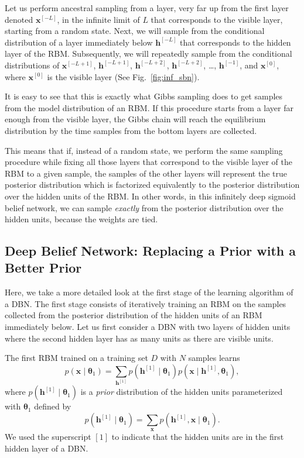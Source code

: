 \documentclass[dissertation,nocontribution,draft*]{aaltoseries}
\newcommand{\qlay}[1]{\left[#1\right]}
\newcommand{\vect}[1]{\mathbf{#1}}
\newcommand{\vects}[1]{\boldsymbol{#1}}
\newcommand{\vh}[0]{\vect{h}}
\newcommand{\vx}[0]{\vect{x}}
\newcommand{\TT}[0]{{\vects{\theta}}}
\begin{document}
Let us perform ancestral sampling from a layer, very far up
from the first layer denoted $\vx^{\qlay{-L}}$, in the infinite
limit of $L$ that corresponds
to the visible layer, starting from a random state.  Next,
we will sample from the conditional distribution of a layer
immediately below $\vh^{\qlay{-L}}$ that corresponds to the
hidden layer of the RBM. Subsequently, we will repeatedly
sample from the conditional distributions of $\vx^{\qlay{-L+1}}$,
$\vh^{\qlay{-L+1}}$, $\vh^{\qlay{-L+2}}$, $\vh^{\qlay{-L+2}}$, \dots,
$\vh^{\qlay{-1}}$, and $\vx^{\qlay{0}}$, where $\vx^{\qlay{0}}$ is the
visible layer (See Fig.~\ref{fig:inf_sbn}). 

It is easy to see that this is exactly what Gibbs sampling
does to get samples from the model distribution of an RBM.
If this procedure starts from a layer far enough from the
visible layer, the Gibbs chain will reach the equilibrium
distribution by the time samples from the bottom layers are
collected. 

This means that if, instead of a random state, we perform
the same sampling procedure while fixing all those layers
that correspond to the visible layer of the RBM to a given
sample, the samples of the other layers will represent the
true posterior distribution which is factorized equivalently
to the posterior distribution over the hidden units of the
RBM. In other words, in this infinitely deep sigmoid belief
network, we can sample \textit{exactly} from the posterior
distribution over the hidden units, because the weights are
tied.

\subsection{Deep Belief Network: Replacing a Prior with a
Better Prior}
\label{sec:dbn_rbm}

Here, we take a more detailed look at the first stage of the
learning algorithm of a DBN.
The first stage consists of
iteratively training an RBM on the samples collected from
the posterior distribution of the hidden units of an RBM
immediately below. Let us first consider a DBN with two
layers of hidden units where the second hidden layer has
as many units as there are visible units.

The first RBM trained on a training set $D$ with $N$ samples
learns
\[
p(\vx \mid \TT_1) = \sum_{\vh^{\qlay{1}}} p(\vh^{\qlay{1}}\mid \TT_1) p(\vx \mid
\vh^{\qlay{1}}, \TT_1),
\]
where $p(\vh^{\qlay{1}}\mid \TT_1)$ is a \textit{prior} distribution
of the hidden units parameterized with $\TT_1$ defined by
\[
p(\vh^{\qlay{1}} \mid \TT_1) = \sum_{\vx} p(\vh^{\qlay{1}}, \vx \mid \TT_1).
\]
We used the superscript $\qlay{1}$ to indicate that the hidden
units are in the first hidden layer of a DBN.
\end{document}
